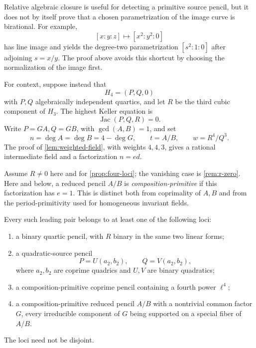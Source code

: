\documentclass[11pt,reqno]{amsart}
\begin{document}
\begin{remark}
Relative algebraic closure is useful for detecting a primitive source
pencil, but it does not by itself prove that a chosen parametrization of the
image curve is birational.  For example,
\[
[x:y:z]\longmapsto[x^2:y^2:0]
\]
has line image and yields the degree-two parametrization \([s^2:1:0]\) after
adjoining \(s=x/y\).  The proof above avoids this shortcut by choosing the
normalization of the image first.
\end{remark}

For context, suppose instead that
\[
H_4=(P,Q,0)
\]
with \(P,Q\) algebraically independent quartics, and let \(R\) be the third
cubic component of \(H_3\).  The highest Keller equation is
\[
\operatorname{Jac}(P,Q,R)=0.
\]
Write \(P=GA,Q=GB\), with \(\gcd(A,B)=1\), and set
\[
n=\deg A=\deg B=4-\deg G,\qquad
t=A/B,\qquad w=R^4/Q^3.
\]
The proof of \cref{lem:weighted-field}, with weights \(4,4,3\), gives a
rational intermediate field and a factorization \(n=ed\).

Assume \(R\ne0\) here and for \cref{prop:four-loci}; the vanishing
case is \cref{rem:r-zero}.  Here and below, a reduced pencil \(A/B\) is
\emph{composition-primitive} if this factorization has \(e=1\).  This is
distinct both from coprimality of \(A,B\) and from the period-primitivity
used for homogeneous invariant fields.

\begin{proposition}
\label{prop:four-loci}
Every such leading pair belongs to at least one of the following loci:
\begin{enumerate}[label=(\roman*)]
\item a binary quartic pencil, with \(R\) binary in the same two linear
forms;
\item a quadratic-source pencil
\[
P=U(a_2,b_2),\qquad Q=V(a_2,b_2),
\]
where \(a_2,b_2\) are coprime quadrics and \(U,V\) are binary quadratics;
\item a composition-primitive coprime pencil containing a fourth power
\(\ell^4\);
\item a composition-primitive reduced pencil \(A/B\) with a nontrivial
common factor \(G\), every irreducible component of \(G\) being supported on
a special fiber of \(A/B\).
\end{enumerate}
The loci need not be disjoint.
\end{proposition}
\end{document}
